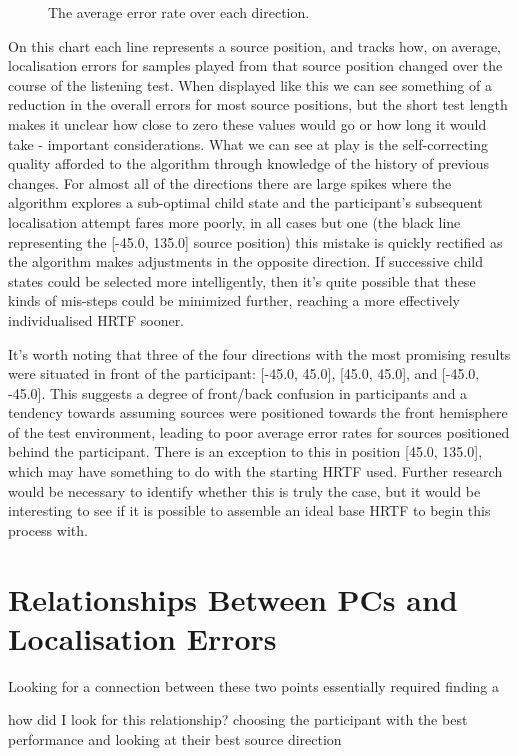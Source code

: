 \begin{figure}
	\caption{The average error rate over each direction.}
\end{figure}

On this chart each line represents a source position, and tracks how, on average, localisation errors for samples played from that source position changed over the course of the listening test. When displayed like this we can see something of a reduction in the overall errors for most source positions, but the short test length makes it unclear how close to zero these values would go or how long it would take - important considerations. What we can see at play is the self-correcting quality afforded to the algorithm through knowledge of the history of previous changes. For almost all of the directions there are large spikes where the algorithm explores a sub-optimal child state and the participant's subsequent localisation attempt fares more poorly, in all cases but one (the black line representing the [-45.0, 135.0] source position) this mistake is quickly rectified as the algorithm makes adjustments in the opposite direction. If successive child states could be selected more intelligently, then it's quite possible that these kinds of mis-steps could be minimized further, reaching a more effectively individualised HRTF sooner.

It's worth noting that three of the four directions with the most promising results were situated in front of the participant: [-45.0, 45.0], [45.0, 45.0], and [-45.0, -45.0]. This suggests a degree of front/back confusion in participants and a tendency towards assuming sources were positioned towards the front hemisphere of the test environment, leading to poor average error rates for sources positioned behind the participant. There is an exception to this in position [45.0, 135.0], which may have something to do with the starting HRTF used. Further research would be necessary to identify whether this is truly the case, but it would be interesting to see if it is possible to assemble an ideal base HRTF to begin this process with.

\section{Relationships Between PCs and Localisation Errors}
Looking for a connection between these two points essentially required finding a 

how did I look for this relationship? choosing the participant with the best performance and looking at their best source direction 

